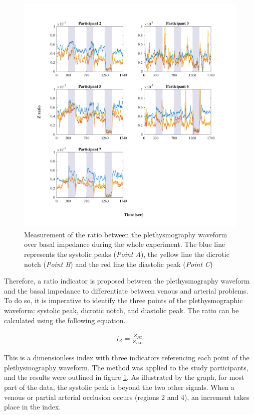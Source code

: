 \begin{figure}[!htpb]
	\includegraphics[width=1\textwidth,keepaspectratio]{figure_apa_8}    
	\caption[Ratio of the plethysmography waveform over basal impedance during the experiment]{Measurement of the ratio between the plethysmography waveform over basal impedance during the whole experiment. The blue line represents the systolic peaks (\textit{Point A}), the yellow line the dicrotic notch (\textit{Point B}) and the red line the diastolic peak (\textit{Point C})}
	\label{fig:ratio Z}
\end{figure}

Therefore, a ratio indicator is proposed between the plethysmography waveform and the basal impedance to differentiate between venous and arterial problems. To do so, it is imperative to identify the three points of the plethysmographic waveform: systolic peak, dicrotic notch, and diastolic peak. The ratio can be calculated using the following equation.

\begin{align}
	\label{eq:ratio Z}
	i_Z = \frac{Z_{PG}}{Z_{BAS}}
\end{align}


This is a dimensionless index with three indicators referencing each point of the plethysmography waveform. The method was applied to the study participants, and the results were outlined in figure \ref{fig:ratio Z}. As illustrated by the graph, for most part of the data, the systolic peak is beyond the two other signals. When a venous or partial arterial occlusion occurs (regions 2 and 4), an increment takes place in the index. 

